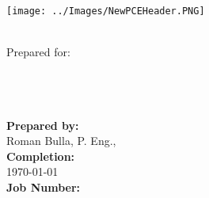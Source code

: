 \begin{titlepage}
\thispagestyle{empty}
\center %

\begin{center}
\texttt{[image: ../Images/NewPCEHeader.PNG]}
\end{center}

\begin{center}
\vspace{20mm}
\Huge \DocTitle \\ %
\vspace{50mm}
\large Prepared for: \\
\LARGE\textbf{\Customer} \\
\large\textbf{\Target}\\
\small\textbf{\Address}\\
\end{center}



 
\begin{flushleft} \large
\vfill

\textbf{Prepared by:} \\
Roman Bulla, P. Eng., \PCERep \\
\vspace{12pt} 
\textbf{Completion:}\\
\today \\ 
\vspace{12pt} 
\textbf{Job Number:}\\
\JobNum \\
\end{flushleft}

\end{titlepage}
